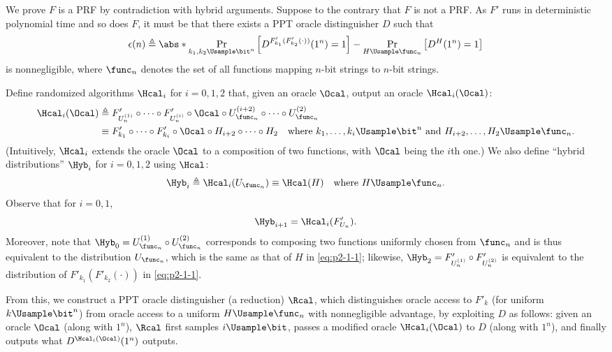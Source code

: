 \begin{answer}[a]
    We prove $F$ is a PRF by contradiction with hybrid arguments.
    Suppose to the contrary that $F$ is not a PRF. As $F'$ runs in deterministic polynomial time and so does $F$, it must be that there exists a PPT oracle distinguisher $D$ such that
    \begin{equation}\label{eq:p2-1-1}
        \epsilon(n)\triangleq \abs*{\Pr_{k_1,k_2\Usample\bit^n}\left[D^{F'_{k_1}(F'_{k_2}(\cdot))}(1^n)=1\right] - \Pr_{H\Usample\func_n}\left[D^{H}(1^n)=1\right]}
    \end{equation}
    is nonnegligible, where $\func_n$ denotes the set of all functions mapping $n$-bit strings to $n$-bit strings.

    Define randomized algorithms $\Hcal_i$ for $i=0,1,2$ that, given an oracle $\Ocal$, output an oracle $\Hcal_i(\Ocal)$:
    \begin{align*}
        \Hcal_i(\Ocal)
        &\triangleq F'_{U_n^{(1)}}\circ \cdots \circ F'_{U_n^{(i)}} \circ \Ocal \circ U_{\func_n}^{(i+2)} \circ \cdots \circ U_{\func_n}^{(2)}  \\
        &\equiv F'_{k_1}\circ \cdots \circ F'_{k_i} \circ \Ocal \circ H_{i+2} \circ \cdots \circ H_{2}  
        \quad \textrm{where } k_1,\ldots,k_i\Usample\bit^n \textrm{ and } H_{i+2},\ldots,H_{2}\Usample\func_n.
    \end{align*}
    (Intuitively, $\Hcal_i$ extends the oracle $\Ocal$ to a composition of two functions, with $\Ocal$ being the $i$th one.)
    We also define ``hybrid distributions'' $\Hyb_i$ for $i=0,1,2$ using $\Hcal$:
    \begin{equation}\label{eq:p2-1-2}
        \Hyb_i \triangleq \Hcal_i(U_{\func_n}) \equiv \Hcal(H)\quad \textrm{where } H\Usample\func_n.
    \end{equation}
    Observe that for $i=0,1$,
    \begin{equation}\label{eq:p2-1-3}
        \Hyb_{i+1} = \Hcal_i(F'_{U_n}).
    \end{equation}
    Moreover, note that $\Hyb_0=U_{\func_n}^{(1)}\circ U_{\func_n}^{(2)}$ corresponds to composing two functions uniformly chosen from $\func_n$ and is thus equivalent to the distribution $U_{\func_n}$, which is the same as that of $H$ in \eqref{eq:p2-1-1}; likewise, $\Hyb_2 = F'_{U_n^{(1)}}\circ F'_{U_n^{(2)}}$ is equivalent to the distribution of $F'_{k_1}(F'_{k_2}(\cdot))$ in \eqref{eq:p2-1-1}.

    From this, we construct a PPT oracle distinguisher (a reduction) $\Rcal$, which distinguishes oracle access to $F'_k$ (for uniform $k\Usample \bit^n$) from oracle access to a uniform $H\Usample\func_n$ with nonnegligible advantage, by exploiting $D$ as follows: given an oracle $\Ocal$ (along with $1^n$), $\Rcal$ first samples $i\Usample\bit$, passes a modified oracle $\Hcal_i(\Ocal)$ to $D$ (along with $1^n$), and finally outputs what $D^{\Hcal_i(\Ocal)}(1^n)$ outputs.


\end{answer}
